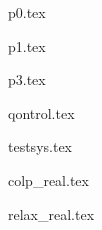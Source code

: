 \documentclass[13pt,d,ruslang]{vakthesisatu}
\author{\dissauthorFullRu}
\title{\booknameRu}
\date{\bookyear}
\begin{document}


\clearpage
\tableofcontents




{p0.tex} %

{p1.tex} %


{p3.tex} %

{qontrol.tex} %

{testsys.tex} %

{colp_real.tex} %

{relax_real.tex} %







\printbibliography
\label{e:atu}{~}
\end{document}
